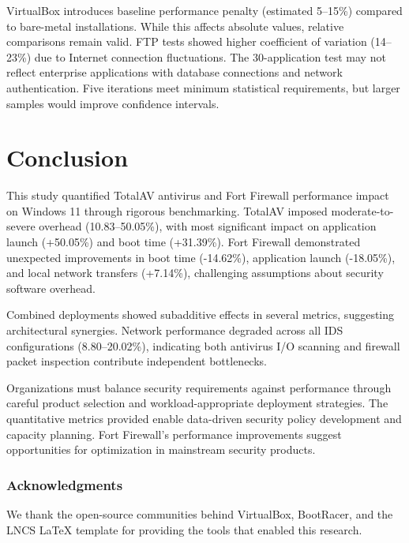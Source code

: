 \documentclass[runningheads,a4paper,english]{llncs}[2022/01/12]
\begin{document}
VirtualBox introduces baseline performance penalty (estimated 5--15\%) compared to bare-metal installations. While this affects absolute values, relative comparisons remain valid. FTP tests showed higher coefficient of variation (14--23\%) due to Internet connection fluctuations. The 30-application test may not reflect enterprise applications with database connections and network authentication. Five iterations meet minimum statistical requirements, but larger samples would improve confidence intervals.

\section{Conclusion}
\label{sec:conclusion}

This study quantified TotalAV antivirus and Fort Firewall performance impact on Windows 11 through rigorous benchmarking. TotalAV imposed moderate-to-severe overhead (10.83--50.05\%), with most significant impact on application launch (+50.05\%) and boot time (+31.39\%). Fort Firewall demonstrated unexpected improvements in boot time (-14.62\%), application launch (-18.05\%), and local network transfers (+7.14\%), challenging assumptions about security software overhead.

Combined deployments showed subadditive effects in several metrics, suggesting architectural synergies. Network performance degraded across all IDS configurations (8.80--20.02\%), indicating both antivirus I/O scanning and firewall packet inspection contribute independent bottlenecks.

Organizations must balance security requirements against performance through careful product selection and workload-appropriate deployment strategies. The quantitative metrics provided enable data-driven security policy development and capacity planning. Fort Firewall's performance improvements suggest opportunities for optimization in mainstream security products.

\subsubsection*{Acknowledgments}
We thank the open-source communities behind VirtualBox, BootRacer, and the LNCS LaTeX template for providing the tools that enabled this research.



\end{document}
